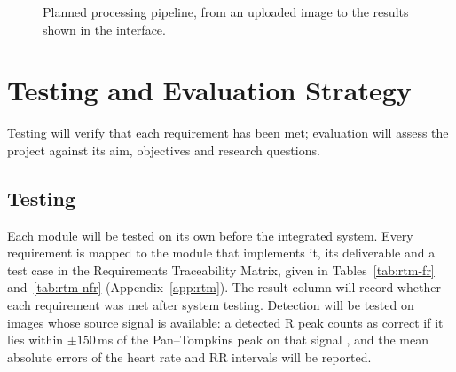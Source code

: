\begin{figure}[!htbp]
  \centering
  \caption{Planned processing pipeline, from an uploaded image to the results shown in the interface.}
  \label{fig:pipeline}
\end{figure}

\section{Testing and Evaluation Strategy}
\label{sec:evaluation}

Testing will verify that each requirement has been met; evaluation will assess the project against its aim, objectives and research questions.

\subsection{Testing}
\label{sec:testing}

Each module will be tested on its own before the integrated system. Every requirement is mapped to the module that implements it, its deliverable and a test case in the Requirements Traceability Matrix, given in Tables~\ref{tab:rtm-fr} and~\ref{tab:rtm-nfr} (Appendix~\ref{app:rtm}). The result column will record whether each requirement was met after system testing. Detection will be tested on images whose source signal is available: a detected R peak counts as correct if it lies within $\pm150$\,ms of the Pan--Tompkins peak on that signal \cite{pan_real-time_1985}, and the mean absolute errors of the heart rate and RR intervals will be reported.

